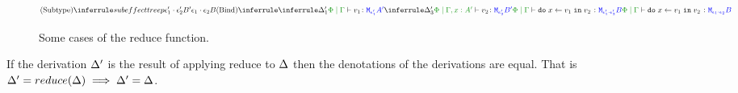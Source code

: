 \documentclass{Report}
\begin{document}
\begin{figure}
\begin{framed}
    \begin{equation}
        \scalebox{0.8}{$
        \ntreeruleII{Subtype}{
            subeffecttreep{\e_1'\dot\e_2'}{B'}{\e_1\dot\e_2}{B}
        }{
            \ntreeruleII{Bind}{
                \treeruleI{
                    \D'_1
                }{
                    \gpetyperelation{v_1}{\M{\e_1'}{A'}}
                }
            }{
                \treeruleI{
                    \D'_3
                }{
                    \etyperelation{\P}{\G, x: A'}{v_2}{\M{\e_2'}{B'}}
                }
            }{
            \gpetyperelation{\doin{x}{v_1}{v_2}}{\M{\e_1'\dot\e_2'}{B}}
            }
        }{
            \gpetyperelation{\doin{x}{v_1}{v_2}}{\M{\e_1\dot\e_2}{B}}
        }
        $}
    \end{equation}
    \end{framed}

    \caption{Some cases of the reduce function.}
    \label{ReduceFunctionCases}
\end{figure}

\begin{theorem}
   If the derivation $\Delta'$ is the result of applying  reduce to $\Delta$ then the denotations of the derivations are equal. That is $\Delta' = reduce(\Delta) \implies \Delta' = \Delta$.
\end{theorem}
\end{document}
